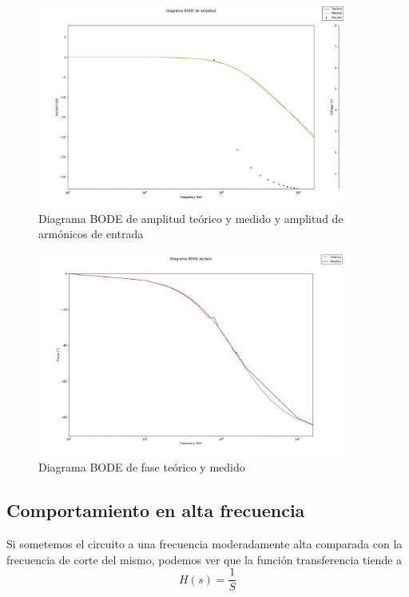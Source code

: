 \begin{figure}[H]
    \centering
    \includegraphics[width=0.9\textwidth]{./EJ2/EJ2_BODE_teorico.png}
    \caption{Diagrama BODE de amplitud te\'orico y medido y amplitud de arm\'onicos de entrada}
    \label{fig: bode_amp_superp_2} 
\end{figure}

\begin{figure}[H]
    \centering
    \includegraphics[width=0.9\textwidth]{./EJ2/EJ2_fase_BODE.png}
    \caption{Diagrama BODE de fase te\'orico y medido}
    \label{fig: bode_phase_superp_2} 
\end{figure}

\subsection{Comportamiento en alta frecuencia}

Si sometemos el circuito a una frecuencia moderadamente alta comparada con la frecuencia de corte del mismo, podemos ver que la funci\'on transferencia tiende a 
\begin{equation}\label{integrador_2}
    H(s)=\frac{1}{S}
\end{equation}


